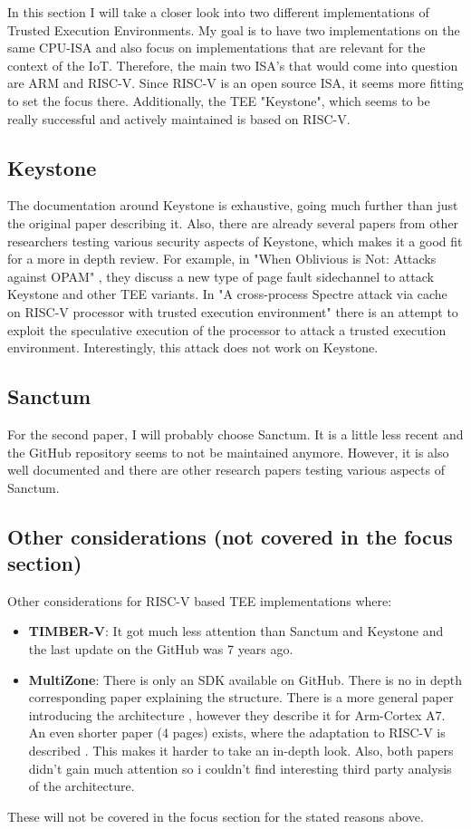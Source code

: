 In this section I will take a closer look into two different implementations of Trusted Execution Environments. My goal is to have two implementations on the same CPU-ISA and also focus on implementations that are relevant for the context of the IoT. Therefore, the main two ISA's that would come into question are ARM and RISC-V. Since RISC-V is an open source ISA, it seems more fitting to set the focus there. Additionally, the TEE "Keystone", which seems to be really successful and actively maintained is based on RISC-V. 

\subsection{Keystone \cite{keystone_paper}}
The documentation around Keystone is exhaustive, going much further than just the original paper describing it. Also, there are already several papers from other researchers testing various security aspects of Keystone, which makes it a good fit for a more in depth review. For example, in "When Oblivious is Not: Attacks against OPAM" \cite{Roy2020}, they discuss a new type of page fault sidechannel to attack Keystone and other TEE variants. In "A cross-process Spectre attack via cache on RISC-V processor with trusted execution environment" \cite{spectre_riscv} there is an attempt to exploit the speculative execution of the processor to attack a trusted execution environment. Interestingly, this attack does not work on Keystone.

\subsection{Sanctum \cite{sanctum_paper}}
For the second paper, I will probably choose Sanctum. It is a little less recent and the GitHub repository seems to not be maintained anymore. However, it is also well documented and there are other research papers testing various aspects of Sanctum. 

\subsection{Other considerations (not covered in the focus section)}
Other considerations for RISC-V based TEE implementations where:
\begin{itemize}
    \item \textbf{TIMBER-V}: It got much less attention than Sanctum and Keystone and the last update on the GitHub was 7 years ago. \cite{timber-v}
    \item \textbf{MultiZone}: There is only an SDK available on GitHub. There is no in depth corresponding paper explaining the structure. There is a more general paper introducing the architecture \cite{multizone_arm}, however they describe it for Arm-Cortex A7. An even shorter paper (4 pages) exists, where the adaptation to RISC-V is described \cite{multizone_riscv}. This makes it harder to take an in-depth look. Also, both papers didn't gain much attention so i couldn't find interesting third party analysis of the architecture.
\end{itemize}

These will not be covered in the focus section for the stated reasons above.


